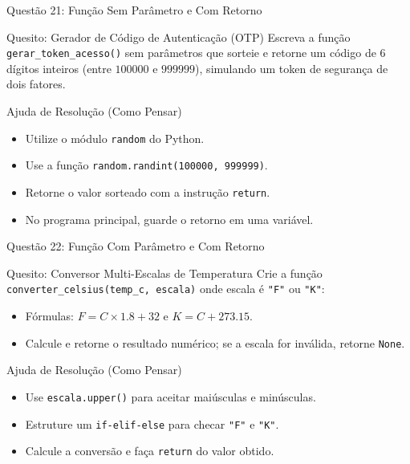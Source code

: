 \begin{frame}{Questão 21: Função Sem Parâmetro e Com Retorno}
    \begin{block}{Quesito: Gerador de Código de Autenticação (OTP)}
        Escreva a função \texttt{gerar\_token\_acesso()} sem parâmetros que sorteie e retorne um código de $6$ dígitos inteiros (entre $100000$ e $999999$), simulando um token de segurança de dois fatores.
    \end{block}

    \begin{exampleblock}{Ajuda de Resolução (Como Pensar)}
        \begin{itemize}
            \item Utilize o módulo \texttt{random} do Python.
            \item Use a função \texttt{random.randint(100000, 999999)}.
            \item Retorne o valor sorteado com a instrução \texttt{return}.
            \item No programa principal, guarde o retorno em uma variável.
        \end{itemize}
    \end{exampleblock}
\end{frame}

\begin{frame}{Questão 22: Função Com Parâmetro e Com Retorno}
    \begin{block}{Quesito: Conversor Multi-Escalas de Temperatura}
        Crie a função \texttt{converter\_celsius(temp\_c, escala)} onde escala é \texttt{"F"} ou \texttt{"K"}:
        \begin{itemize}
            \item Fórmulas: $F = C \times 1.8 + 32$ e $K = C + 273.15$.
            \item Calcule e retorne o resultado numérico; se a escala for inválida, retorne \texttt{None}.
        \end{itemize}
    \end{block}

    \begin{exampleblock}{Ajuda de Resolução (Como Pensar)}
        \begin{itemize}
            \item Use \texttt{escala.upper()} para aceitar maiúsculas e minúsculas.
            \item Estruture um \texttt{if-elif-else} para checar \texttt{"F"} e \texttt{"K"}.
            \item Calcule a conversão e faça \texttt{return} do valor obtido.
        \end{itemize}
    \end{exampleblock}
\end{frame}

